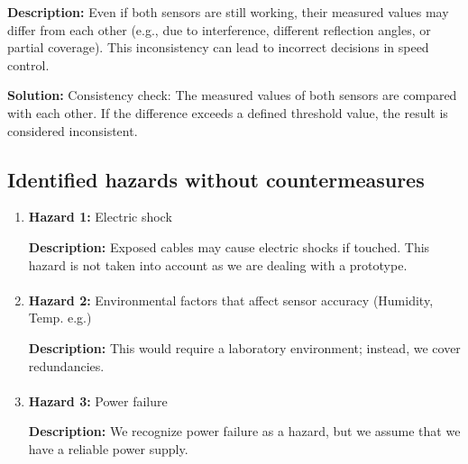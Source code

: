 \begin{enumerate}
            \textbf{Description:} Even if both sensors are still working, their measured values may differ from each other (e.g., due to interference, different reflection angles, or partial coverage). This inconsistency can lead to incorrect decisions in speed control.
            
            \textbf{Solution:} Consistency check: The measured values of both sensors are compared with each other. If the difference exceeds a defined threshold value, the result is considered inconsistent.
        
        \paragraph{}
	\end{enumerate}
	
\subsection{Identified hazards without countermeasures }

	\begin{enumerate}
		\item \textbf{Hazard 1:} Electric shock

            \textbf{Description:} Exposed cables may cause electric shocks if touched. This hazard is not taken into account as we are dealing with a prototype.
            
        \paragraph{}
		\item \textbf{Hazard 2:} Environmental factors that affect sensor accuracy (Humidity, Temp. e.g.)
        
            \textbf{Description:} This would require a laboratory environment; instead, we cover redundancies.

        \paragraph{}
		\item \textbf{Hazard 3:} Power failure
        
            \textbf{Description:} We recognize power failure as a hazard, but we assume that we have a reliable power supply.


	\end{enumerate}